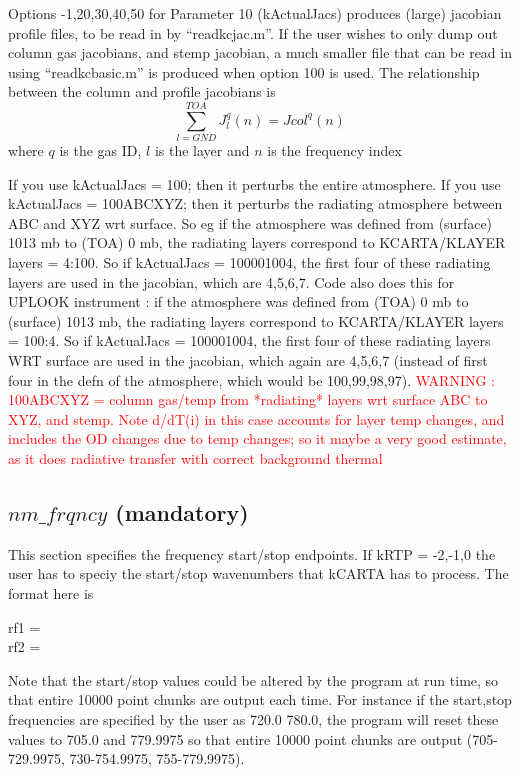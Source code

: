 \documentclass[12pt]{article}
\newcommand{\ttab}{\indent\indent}
\begin{document}
Options -1,20,30,40,50 for Parameter 10 ({\sf kActualJacs}) produces (large) 
jacobian profile files, to be read in by ``readkcjac.m''. If the user wishes 
to only dump out column gas jacobians, and stemp jacobian, a much smaller 
file that can be read in using ``readkcbasic.m'' is produced when option 100
is used. The relationship between the column and profile jacobians is
\[
\displaystyle\sum_{l=GND}^{TOA} J^{q}_{l}(n) = Jcol^{q}(n)
\]
where $q$ is the  gas ID, $l$ is the layer and $n$ is the frequency index

If you use {\sf kActualJacs} = 100; then it perturbs the entire atmosphere.
If you use {\sf kActualJacs} = 100ABCXYZ; then it perturbs the radiating 
atmosphere between ABC and XYZ wrt surface. So eg if the atmosphere was 
defined from 
(surface) 1013 mb to (TOA) 0 mb, the radiating layers correspond to 
KCARTA/KLAYER layers = 4:100. So if {\sf kActualJacs} = 100001004, the first 
four of these radiating layers are used in the jacobian, which are 4,5,6,7.
Code also does this for UPLOOK instrument : if the atmosphere was defined from 
(TOA) 0 mb to (surface) 1013 mb, the radiating layers correspond to 
KCARTA/KLAYER layers = 100:4. So if {\sf kActualJacs} = 100001004, the first 
four of these radiating layers WRT surface are used in the jacobian, 
which again are 4,5,6,7 (instead of first four in the defn of the atmosphere, 
which would be 100,99,98,97).
\textcolor{red}{WARNING : 100ABCXYZ = column gas/temp from *radiating* layers 
wrt surface ABC to XYZ, and stemp. Note d/dT(i) in this case accounts for 
layer temp changes, and includes the OD changes due to temp changes; 
so it maybe a very good estimate, as it does radiative transfer
with correct background thermal}

\subsection{$nm\_frqncy$ (mandatory)}

This section specifies the frequency start/stop endpoints.  If kRTP = -2,-1,0 
the user has to speciy the start/stop wavenumbers that kCARTA has to process. 
The format here is

\medskip
{\sf
\ttab rf1 =  \\
\ttab rf2 = 
}
\medskip

Note that the start/stop values could be altered by the program at
run time, so that entire 10000 point chunks are output each time.  
For instance if the start,stop frequencies are specified by the user
as 720.0 780.0, the program will reset these values to 705.0 and
779.9975 so that entire 10000 point chunks are output (705-729.9975,
730-754.9975, 755-779.9975).
\end{document}

